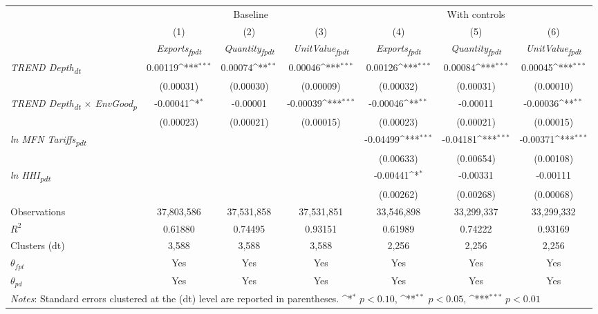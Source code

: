 {
\def\sym#1{\ifmmode^{#1}\else\(^{#1}\)\fi}
\begin{tabular}{l*{6}{c}}
\toprule
&\multicolumn{3}{c}{Baseline}&\multicolumn{3}{c}{With controls}\\\cmidrule(lr){2-4}\cmidrule(lr){5-7}
&(1)&(2)&(3)&(4)&(5)&(6)\\
&\textit{Exports\textsubscript{fpdt}}&\textit{Quantity\textsubscript{fpdt}}&\textit{UnitValue\textsubscript{fpdt}}&\textit{Exports\textsubscript{fpdt}}&\textit{Quantity\textsubscript{fpdt}}&\textit{UnitValue\textsubscript{fpdt}}\\
\midrule
\textit{TREND Depth\textsubscript{dt}} & 0.00119\sym{***} & 0.00074\sym{**} & 0.00046\sym{***} & 0.00126\sym{***} & 0.00084\sym{***} & 0.00045\sym{***}\\
 & (0.00031) & (0.00030) & (0.00009) & (0.00032) & (0.00031) & (0.00010)\\
\addlinespace
\textit{TREND Depth\textsubscript{dt} $\times$ EnvGood\textsubscript{p}} & -0.00041\sym{*} & -0.00001 & -0.00039\sym{***} & -0.00046\sym{**} & -0.00011 & -0.00036\sym{**}\\
 & (0.00023) & (0.00021) & (0.00015) & (0.00023) & (0.00021) & (0.00015)\\
\addlinespace
\textit{ln MFN Tariffs\textsubscript{pdt}} &  &  &  & -0.04499\sym{***} & -0.04181\sym{***} & -0.00371\sym{***}\\
 &  &  &  & (0.00633) & (0.00654) & (0.00108)\\
\addlinespace
\textit{ln HHI\textsubscript{pdt}} &  &  &  & -0.00441\sym{*} & -0.00331 & -0.00111\\
 &  &  &  & (0.00262) & (0.00268) & (0.00068)\\
\midrule
Observations & 37,803,586 & 37,531,858 & 37,531,851 & 33,546,898 & 33,299,337 & 33,299,332\\
$R^{2}$ & 0.61880 & 0.74495 & 0.93151 & 0.61989 & 0.74222 & 0.93169\\
Clusters (dt) & 3,588 & 3,588 & 3,588 & 2,256 & 2,256 & 2,256\\
$\theta_{fpt}$ & Yes & Yes & Yes & Yes & Yes & Yes\\
$\theta_{pd}$ & Yes & Yes & Yes & Yes & Yes & Yes\\
\bottomrule
\multicolumn{7}{l}{\footnotesize \textit{Notes}: Standard errors clustered at the (dt) level are reported in parentheses. \sym{*} \(p<0.10\), \sym{**} \(p<0.05\), \sym{***} \(p<0.01\)}\\
\end{tabular}
}
